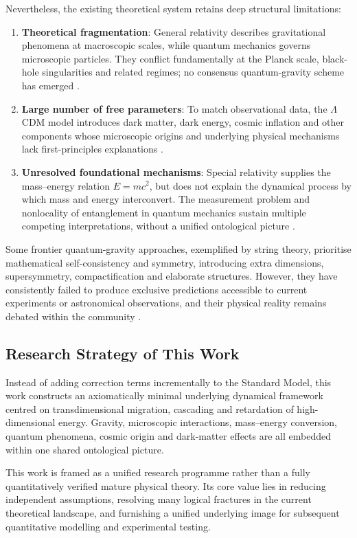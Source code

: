 \documentclass[12pt,a4paper]{article}
\begin{document}
Nevertheless, the existing theoretical system retains deep structural limitations:
\begin{enumerate}
\item \textbf{Theoretical fragmentation}: General relativity describes gravitational phenomena at macroscopic scales, while quantum mechanics governs microscopic particles. They conflict fundamentally at the Planck scale, black-hole singularities and related regimes; no consensus quantum-gravity scheme has emerged \cite{weinberg1972, rovelli2004}.
\item \textbf{Large number of free parameters}: To match observational data, the $\Lambda$CDM model introduces dark matter, dark energy, cosmic inflation and other components whose microscopic origins and underlying physical mechanisms lack first-principles explanations \cite{peebles1993}.
\item \textbf{Unresolved foundational mechanisms}: Special relativity supplies the mass–energy relation $E=mc^2$, but does not explain the dynamical process by which mass and energy interconvert. The measurement problem and nonlocality of entanglement in quantum mechanics sustain multiple competing interpretations, without a unified ontological picture \cite{bell1964, zeilinger2010}.
\end{enumerate}

Some frontier quantum-gravity approaches, exemplified by string theory, prioritise mathematical self-consistency and symmetry, introducing extra dimensions, supersymmetry, compactification and elaborate structures. However, they have consistently failed to produce exclusive predictions accessible to current experiments or astronomical observations, and their physical reality remains debated within the community \cite{smolin2006, witten1995}.

\subsection{Research Strategy of This Work}
Instead of adding correction terms incrementally to the Standard Model, this work constructs an axiomatically minimal underlying dynamical framework centred on transdimensional migration, cascading and retardation of high-dimensional energy. Gravity, microscopic interactions, mass–energy conversion, quantum phenomena, cosmic origin and dark-matter effects are all embedded within one shared ontological picture.

This work is framed as a unified research programme rather than a fully quantitatively verified mature physical theory. Its core value lies in reducing independent assumptions, resolving many logical fractures in the current theoretical landscape, and furnishing a unified underlying image for subsequent quantitative modelling and experimental testing.
\end{document}
